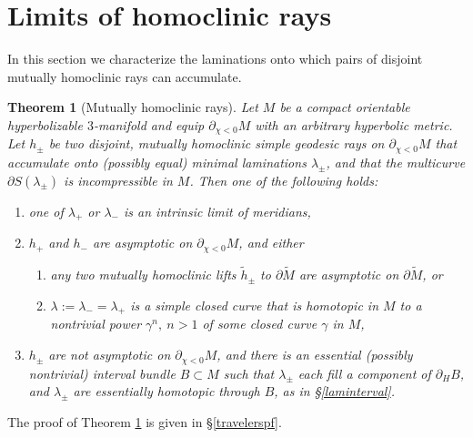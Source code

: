 \documentclass[12pt]{amsart}
\newtheorem{theorem}{Theorem}[section] \newtheorem{philosophy}{Statement}[theorem]
\theoremstyle{definition}
\theoremstyle{remark}
\begin{document}
\section {Limits of homoclinic rays}

In this section we characterize the laminations onto which pairs of disjoint mutually homoclinic rays can accumulate.



\begin{theorem}[Mutually homoclinic rays]\label {travelers}
Let $M$ be a compact orientable hyperbolizable $3$-manifold and equip $\partial_{\chi<0} M$ with an arbitrary hyperbolic metric. Let $h_\pm$ be two disjoint, mutually homoclinic simple geodesic rays on  $\partial_{\chi<0} M$ that accumulate onto (possibly equal) minimal laminations $\lambda_\pm$, and that the multicurve $\partial S(\lambda_\pm)$ is incompressible in $M$. Then one of the following holds:
\begin{enumerate}
\item one of $\lambda_+$ or $\lambda_-$ is an intrinsic limit of meridians,
\item $ h_+$ and $h_-$ are asymptotic on $\partial_{\chi<0} M$, and either 
\begin{enumerate}
	\item {any} two mutually homoclinic lifts $\tilde h_\pm$ to $\partial \tilde M$ are asymptotic on $\partial \tilde M$, or
	\item $\lambda:=\lambda_-=\lambda_+$ is a simple closed curve that is homotopic in $M$ to a nontrivial power $\gamma^n, \ n>1$ of some closed curve $\gamma$ in $M$,
\end{enumerate}

\item $h_\pm$ are not asymptotic on $\partial_{\chi<0} M$, and there is an essential (possibly nontrivial) interval bundle $B \subset M$ such that $\lambda_\pm$ each fill a component of $\partial_H B$, and $\lambda_\pm$ are essentially homotopic through $B$, as in \S \ref{laminterval}.
\end{enumerate}
\end{theorem}


The proof of Theorem \ref{travelers} is given in \S \ref{travelerspf}.

\medskip
\end{document}
